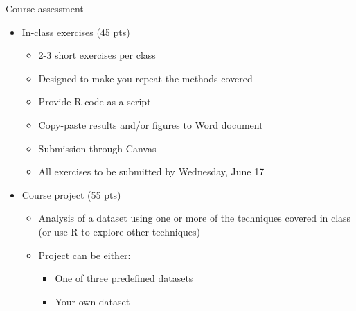 \documentclass[aspectratio=169]{beamer}\usepackage[]{graphicx}\usepackage[]{color}
\begin{document}

\begin{frame}{Course assessment}
\begin{itemize}
  \item In-class exercises (45 pts)
  \begin{itemize}
    \item 2-3 short exercises per class
    \item Designed to make you repeat the methods covered
    \item Provide R code as a script
    \item Copy-paste results and/or figures to Word document
    \item Submission through Canvas
    \item All exercises to be submitted by Wednesday, June 17
  \end{itemize}
  \item<2-> Course project (55 pts)
  \begin{itemize}
    \item Analysis of a dataset using one or more of the techniques covered in class (or use R to explore other techniques)
    \item Project can be either:
  	\begin{itemize}
  		\item One of three predefined datasets
  		\item Your own dataset
  	\end{itemize}
  \end{itemize}
\end{itemize}
\end{frame}
\end{document}
